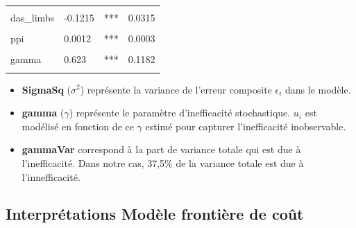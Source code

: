 \documentclass[
  12pt,
]{report}
\begin{document}
\begin{table}[!h]
\begin{tabular}[t]{llll}
\cellcolor{gray!6}{upgrade\_storageTRUE} & \cellcolor{gray!6}{-0.2619} & \cellcolor{gray!6}{***} & \cellcolor{gray!6}{0.0455}\\
das\_limbs & -0.1215 & *** & 0.0315\\
\addlinespace
\cellcolor{gray!6}{network5G} & \cellcolor{gray!6}{0.2022} & \cellcolor{gray!6}{***} & \cellcolor{gray!6}{0.0382}\\
ppi & 0.0012 & *** & 0.0003\\
\cellcolor{gray!6}{sigmaSq} & \cellcolor{gray!6}{0.0861} & \cellcolor{gray!6}{***} & \cellcolor{gray!6}{0.0132}\\
gamma & 0.623 & *** & 0.1182\\
\cellcolor{gray!6}{gammaVar} & \cellcolor{gray!6}{0.3752} & \cellcolor{gray!6}{} & \cellcolor{gray!6}{}\\
\bottomrule
\end{tabular}
\end{table}

\vspace{2em}

\begin{itemize}
\item
  \textbf{SigmaSq} (\(\sigma^2\)) représente la variance de l'erreur
  composite \(\epsilon_i\) dans le modèle.
\item
  \textbf{gamma} (\(\gamma\)) représente le paramètre d'inefficacité
  stochastique. \(u_i\)\hspace{0pt} est modélisé en fonction de ce
  \(\gamma\) estimé pour capturer l'inefficacité inobservable.
\item
  \textbf{gammaVar} correspond à la part de variance totale qui est due
  à l'inefficacité. Dans notre cas, 37,5\% de la variance totale est due
  à l'innefficacité.
\end{itemize}

\newpage

\subsection{Interprétations Modèle frontière de
coût}\label{interpruxe9tations-moduxe8le-frontiuxe8re-de-couxfbt}
\end{document}
